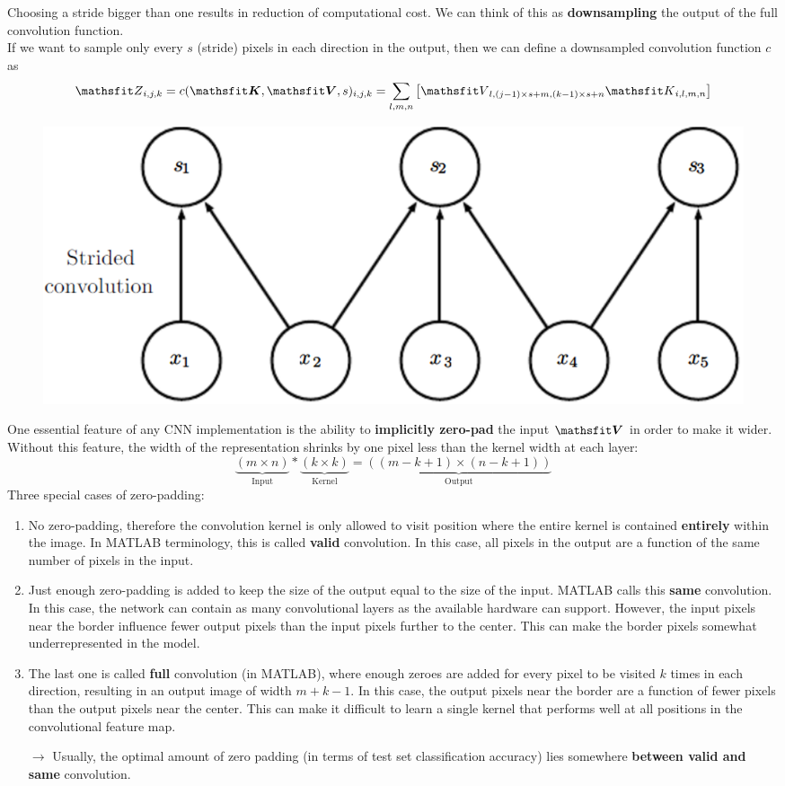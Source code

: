 \begin{multicols}{2}
	Choosing a stride bigger than one results in reduction of computational cost.
	We can think of this as \textbf{downsampling} the output of the full convolution function.\\
	If we want to sample only every $s$ (stride) pixels in each direction in the output, then we can define a downsampled convolution function $c$ as 
	\[ \etZ_{i,j,k} = c(\tK,\tV,s)_{i,j,k} = \sum_{l,m,n}\left[ \etV_{l,(j-1)\times s+m,(k-1)\times s+n} \etK_{i,l,m,n} \right] \]
	\begin{figure}[H]
		\centering
		\includegraphics[width=0.5\linewidth]{images/strided_conv.PNG}
	\end{figure}
	
	One essential feature of any CNN implementation is the ability to\textbf{ implicitly zero-pad} the input $\tV$ in order to make it wider.
	Without this feature, the width of the representation shrinks by one pixel less than the kernel width at each layer:
	\[ \underbrace{(m\times n)}_{\text{Input}} \ast \underbrace{(k\times k)}_{\text{Kernel}} = 
	\underbrace{\left( (m-k+1)\times (n-k+1) \right)}_{\text{Output}} \]
	Three special cases of zero-padding:
	\begin{enumerate}
		\item No zero-padding, therefore the convolution kernel is only allowed to visit position where the entire kernel is contained \textbf{entirely} within the image. In MATLAB terminology, this is called \textbf{valid} convolution. In this case, all pixels in the output are a function of the same number of pixels in the input.
		\item Just enough zero-padding is added to keep the size of the output equal to the size of the input. MATLAB calls this \textbf{same} convolution. In this case, the network can contain as many convolutional layers as the available hardware can support. However, the input pixels near the border influence fewer output pixels than the input pixels further to the center. This can make the border pixels somewhat underrepresented in the model.
		\item The last one is called \textbf{full} convolution (in MATLAB), where enough zeroes are added for every pixel to be visited $k$ times in each direction, resulting in an output image of width $m+k-1$. In this case, the output pixels near the border are a function of fewer pixels than the output pixels near the center. This can make it difficult to learn a single kernel that performs well at all positions in the convolutional feature map.
		\item[$\rightarrow$] Usually, the optimal amount of zero padding (in terms of test set classification accuracy) lies somewhere \textbf{between valid and same} convolution.
	\end{enumerate}


\end{multicols}
